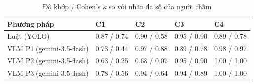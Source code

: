 \begin{table}[t]
\centering
\caption{Độ khớp / Cohen's $\kappa$ so với nhãn đa số của người chấm}
\footnotesize
\begin{tabular}{lllll}
\hline
Phương pháp & C1 & C2 & C3 & C4 \\
\hline
Luật (YOLO) & 0.87 / 0.74 & 0.90 / 0.58 & 0.95 / 0.90 & 0.89 / 0.78 \\
VLM P1 (gemini-3.5-flash) & 0.73 / 0.44 & 0.97 / 0.88 & 0.89 / 0.78 & 0.98 / 0.97 \\
VLM P2 (gemini-3.5-flash) & 0.63 / 0.25 & 0.68 / 0.07 & 0.95 / 0.90 & 1.00 / 1.00 \\
VLM P3 (gemini-3.5-flash) & 0.78 / 0.56 & 0.94 / 0.64 & 0.94 / 0.89 & 1.00 / 1.00 \\
\hline
\end{tabular}
\end{table}